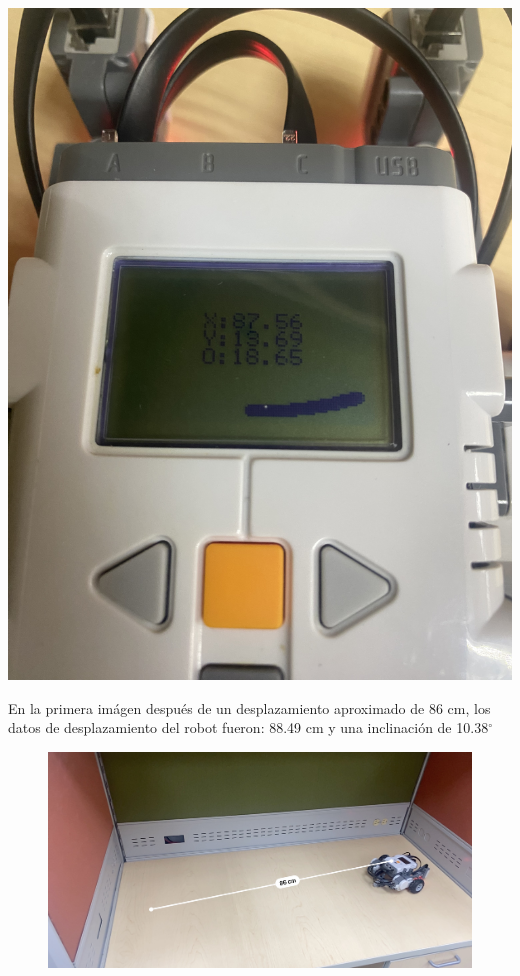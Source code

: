 \documentclass[oneside,twocolumn]{article}
\begin{document}
\includegraphics[scale=0.09]{graficos/error3.png}

En la primera imágen después de un desplazamiento aproximado de 86 cm, los datos de desplazamiento del robot fueron: 88.49 cm y una inclinación de 10.38$^{\circ}$

\begin{figure}[!hb]
  \centering
  \includegraphics[scale=0.18]{graficos/prueba1.JPG}
\end{figure}
\end{document}
